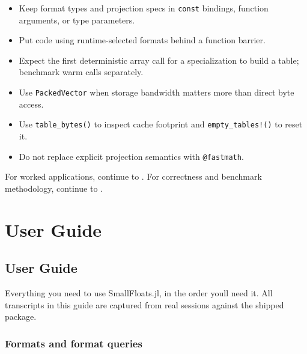 \begin{itemize}
\item Keep format types and projection specs in \texttt{const} bindings, function arguments, or type parameters.


\item Put code using runtime-selected formats behind a function barrier.


\item Expect the first deterministic array call for a specialization to build a table; benchmark warm calls separately.


\item Use \texttt{PackedVector} when storage bandwidth matters more than direct byte access.


\item Use \texttt{table\_bytes()} to inspect cache footprint and \texttt{empty\_tables!()} to reset it.


\item Do not replace explicit projection semantics with \texttt{@fastmath}.

\end{itemize}


For worked applications, continue to . For correctness and benchmark methodology, continue to .



\part{User Guide}


\chapter{User Guide}



\label{10272851679537904033}{}


Everything you need to use SmallFloats.jl, in the order you{\textquotesingle}ll need it. All transcripts in this guide are captured from real sessions against the shipped package.



\section{Formats and format queries}



